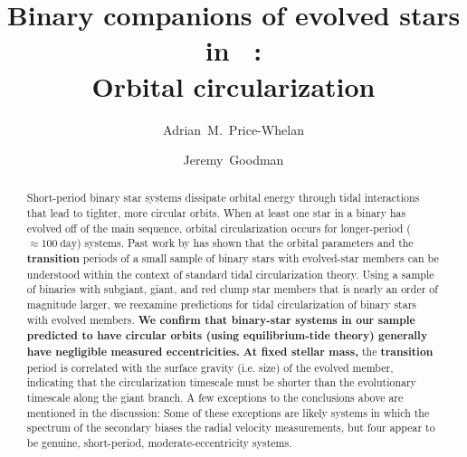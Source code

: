 \documentclass[modern, letterpaper]{aastex62}
\newcommand{\apogee}{\project{\acronym{APOGEE}}}
\newcommand{\DR}{\acronym{DR14}}
\renewcommand{\changes}[1]{\textbf{#1}}
\begin{document}
\sloppy\sloppypar\raggedbottom\frenchspacing %

\title{Binary companions of evolved stars in \apogee\ \DR: \\
       Orbital circularization}

\author[0000-0003-0872-7098]{Adrian~M.~Price-Whelan}

\author[0000-0002-6710-7748]{Jeremy~Goodman}



\begin{abstract}\noindent %
Short-period binary star systems dissipate orbital energy through tidal
interactions that lead to tighter, more circular orbits.
When at least one star in a binary has evolved off of the main sequence, orbital
circularization occurs for longer-period ($\approx 100~\textrm{day}$) systems.
Past work by \citet{Verbunt:1995} has shown that the orbital parameters and the
\changes{transition} periods of a small sample of binary stars with evolved-star
members can be understood within the context of standard tidal circularization
theory.
Using a sample of binaries with subgiant, giant, and red clump star members that
is nearly an order of magnitude larger, we reexamine predictions for tidal
circularization of binary stars with evolved members.
\changes{We confirm that binary-star systems in our sample predicted to have
circular orbits (using equilibrium-tide theory) generally have negligible
measured eccentricities.}
\changes{At fixed stellar mass,} the \changes{transition} period is correlated
with the surface gravity (i.e. size) of the evolved member, indicating that the
circularization timescale must be shorter than the evolutionary timescale along
the giant branch.
A few exceptions to the conclusions above are mentioned in the discussion: Some
of these exceptions are likely systems in which the spectrum of the secondary
biases the radial velocity measurements, but four appear to be genuine,
short-period, moderate-eccentricity systems.

\end{abstract}
\end{document}
